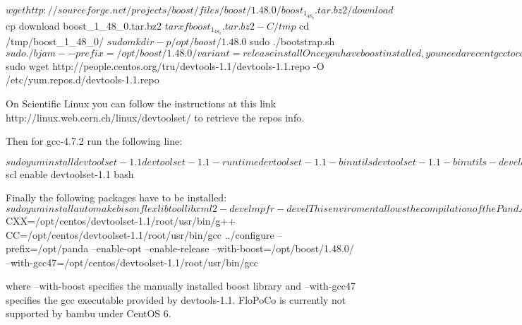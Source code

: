 \begin{DoxyVerbInclude}
   $ wget http://sourceforge.net/projects/boost/files/boost/1.48.0/boost_1_48_0.tar.bz2/download
   $ cp download boost_1_48_0.tar.bz2
   $ tar xf boost_1_48_0.tar.bz2 -C /tmp
   $ cd /tmp/boost_1_48_0/
   $ sudo mkdir -p /opt/boost/1.48.0
   $ sudo ./bootstrap.sh
   $ sudo ./bjam --prefix=/opt/boost/1.48.0/ variant=release install

Once you have boost installed, you need a recent gcc to compile the PandA sources. This can be done with devtools

On CentOS you can retrieve the devtools repos with the following line:

   $ sudo wget http://people.centos.org/tru/devtools-1.1/devtools-1.1.repo -O /etc/yum.repos.d/devtools-1.1.repo

On Scientific Linux you can follow the instructions at this link http://linux.web.cern.ch/linux/devtoolset/ to retrieve the repos info.

Then for gcc-4.7.2 run the following line:

   $ sudo yum install devtoolset-1.1 devtoolset-1.1-runtime devtoolset-1.1-binutils devtoolset-1.1-binutils-devel devtoolset-1.1-build devtoolset-1.1-dwz devtoolset-1.1-elfutils devtoolset-1.1-elfutils-devel devtoolset-1.1-elfutils-libelf devtoolset-1.1-elfutils-libelf-devel devtoolset-1.1-elfutils-libs devtoolset-1.1-gcc devtoolset-1.1-gcc-c++ devtoolset-1.1-gcc-gfortran devtoolset-1.1-gcc-plugin-devel devtoolset-1.1-gdb devtoolset-1.1-libitm-devel devtoolset-1.1-libquadmath-devel devtoolset-1.1-libstdc++-devel devtoolset-1.1-valgrind

After this you can enable gcc-4-7 by typing:

   $ scl enable devtoolset-1.1 bash

Finally the following packages have to be installed:
   $ sudo yum install automake bison flex libtool libxml2-devel mpfr-devel

This enviroment allows the compilation of the PandA framework with a minimal configuration without flopoco library and without Icarus verilog simulator.
The configure we tested for centos is the following one:

   $ CXX=/opt/centos/devtoolset-1.1/root/usr/bin/g++ CC=/opt/centos/devtoolset-1.1/root/usr/bin/gcc ../configure --prefix=/opt/panda --enable-opt --enable-release --with-boost=/opt/boost/1.48.0/ --with-gcc47=/opt/centos/devtoolset-1.1/root/usr/bin/gcc

where --with-boost specifies the manually installed boost library and --with-gcc47 specifies the gcc executable provided by devtools-1.1.
FloPoCo is currently not supported by bambu under CentOS 6.


\end{DoxyVerbInclude}
